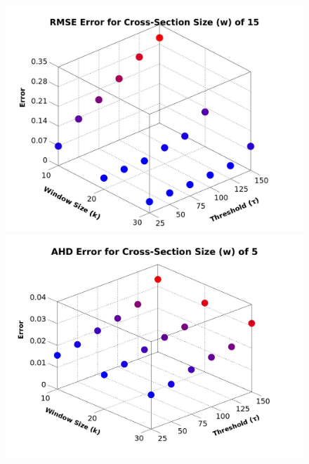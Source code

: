 \begin{figure}
\begin{center}
\begin{minipage}{0.49\linewidth}
     \includegraphics[height=0.25\textheight,width=0.99\linewidth]{images/RMSE_Graph_CS15.jpg}  
  \end{minipage}
  \begin{minipage} {0.49\linewidth} 
    \includegraphics[height=0.25\textheight,width=0.99\linewidth]{images/AHD_Graph_CS5.jpg} 
 

\end{minipage}
\end{center}
\end{figure}
